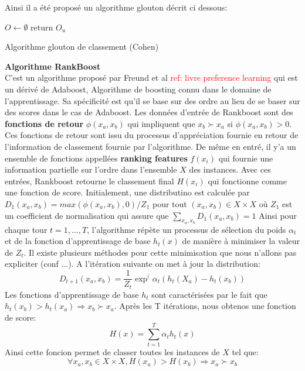\documentclass[a4paper,12pt,openany,oneside]{article}
\begin{document}
Ainsi il a été proposé un algorithme glouton décrit ci dessous: 




\begin{algorithm}[H]
	$O\leftarrow \emptyset$\;
	return $O_u$\;
 \caption{Algorithme glouton de classement (Cohen)}
\end{algorithm}

 \textbf{Algorithme RankBoost}\\
 C'est un algorithme proposé par Freund et al \textcolor{red}{ref: livre preference learning} qui est un dérivé de Adaboost, Algorithme de boosting connu dans le domaine de l'apprentissage. Sa spécificité est qu'il se base sur des ordre au lieu de se baser sur des scores dans le cas de Adaboost. Les données d'entrée de Rankboost sont des \textbf{fonctions de retour} $\phi(x_a,x_b)$ qui impliquent que $x_b\succ x_a$ si $\phi(x_a,x_b)>0$. Ces fonctions de retour sont issu du processus d'appréciation fournie en retour de l'information  de classement fournie par l'algorithme. De même en entré, il y'a un ensemble de fonctions appellées \textbf{ranking features} $f(x_i)$ qui fournie une information partielle sur l'ordre dans l'ensemble $X$ des instances. 
 Avec ces entrées, Rankboost retourne le classement final $H(x_i)$ qui fonctionne comme une fonction de score.
 Initialement, une distributino est calculée par $D_1(x_a,x_b)=max(\phi(x_a,x_b),0)/Z_1$ pour tout $(x_a,x_b)\in X\times X$ où $Z_1$ est un coefficient de normalisation qui assure que $\sum_{x_a, x_b}^{}D_1(x_a,x_b)=1$ Ainsi pour chaque tour $t=1,...,T$, l'algorithme répète un processus de sélection du poids $\alpha_t$ et de la fonction d'apprentissage de base $h_t(x)$ de manière à minimiser la valeur de $Z_t$. Il existe plusieurs méthodes pour cette minimisation que nous n'allons pas expliciter (conf ...). A l'itération suivante on met à jour la distribution:
 \[
 D_{t+1}(x_a, x_b)=\frac{1}{Z_t}\exp^(\alpha_t (h_t(X_a)-h_t(x_b))
 \]
 Les fonctions d'apprentissage de base $h_t$ sont caractérisées par le fait que $h_t(x_b)>h_t(x_a)\Rightarrow x_b\succ x_a$. Après les T itérations, nous obtenos une fonction de score:
 \[
 	H(x)=\sum_{t=1}^{T}\alpha_t h_t (x)
 \]
 Ainsi cette foncion permet de classer toutes les instances de $X$ tel que:
 \[
 	\forall x_a,x_b\in X\times X, H(x_a)>H(x_b)\Rightarrow x_a\succ x_b
 \] 
 
\end{document}
